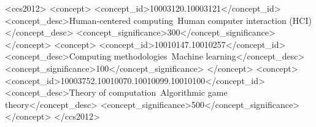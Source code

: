 \documentclass[sigconf]{acmart}
\begin{document}
\begin{CCSXML}
<ccs2012>
   <concept>
       <concept_id>10003120.10003121</concept_id>
       <concept_desc>Human-centered computing~Human computer interaction (HCI)</concept_desc>
       <concept_significance>300</concept_significance>
       </concept>
   <concept>
       <concept_id>10010147.10010257</concept_id>
       <concept_desc>Computing methodologies~Machine learning</concept_desc>
       <concept_significance>100</concept_significance>
       </concept>
   <concept>
       <concept_id>10003752.10010070.10010099.10010100</concept_id>
       <concept_desc>Theory of computation~Algorithmic game theory</concept_desc>
       <concept_significance>500</concept_significance>
       </concept>
 </ccs2012>
\end{CCSXML}





\maketitle












\end{document}
